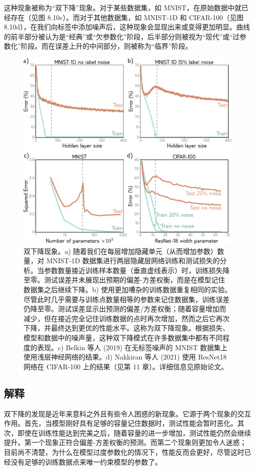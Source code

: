 \documentclass[lang=cn,newtx,10pt,scheme=chinese]{elegantbook}
\begin{document}
这种现象被称为“双下降”现象。对于某些数据集，如 MNIST，在原始数据中就已经存在（见图 8.10c）。而对于其他数据集，如 MNIST-1D 和 CIFAR-100（见图 8.10d），在我们向标签中添加噪声后，这种现象会显现出来或变得更加明显。曲线的前半部分被认为是“经典”或“欠参数化”阶段，后半部分则被视为“现代”或“过参数化”阶段。而在误差上升的中间部分，则被称为“临界”阶段。

\begin{figure}[ht!]
\centering
\includegraphics[width=0.7\linewidth]{PDFFigures/UDLChap8PDF/PerfDoubleDescent.pdf}
\caption{双下降现象。a) 随着我们在每层增加隐藏单元（从而增加参数）数量，对 MNIST-1D 数据集进行两层隐藏层网络训练和测试损失的分析。当参数数量接近训练样本数量（垂直虚线表示）时，训练损失降至零。测试误差并未展现出预期的偏差-方差权衡，而是在模型记住数据集之后继续下降。b) 使用更加嘈杂的训练数据重复相同的实验。尽管此时几乎需要与训练点数量相等的参数来记住数据集，训练误差仍降至零。测试误差显示出预测的偏差/方差权衡；随着容量增加而减少，但在接近完全记住训练数据的点时再次增加，然而之后它再次下降，并最终达到更优的性能水平。这称为双下降现象。根据损失、模型和数据中的噪声量，这种双下降模式在许多数据集中都有不同程度的表现。c) Belkin 等人 (2019) 在无标签噪声的 MNIST 数据集上使用浅层神经网络的结果。d) Nakkiran 等人 (2021) 使用 ResNet18 网络在 CIFAR-100 上的结果（见第 11 章）。详细信息见原始论文。}
\end{figure}

\subsection{解释}
双下降的发现是近年来意料之外且有些令人困惑的新现象。它源于两个现象的交互作用。首先，当模型刚好具有足够的容量记住数据时，测试性能会暂时恶化。其次，即使在训练性能达到完美之后，随着容量的进一步增加，测试性能仍然会继续提升。第一个现象正符合偏差-方差权衡的预测。而第二个现象则更加令人迷惑；目前尚不清楚，为什么在模型过度参数化的情况下，性能反而会更好，尽管这时已经没有足够的训练数据点来唯一约束模型的参数了。
\end{document}
